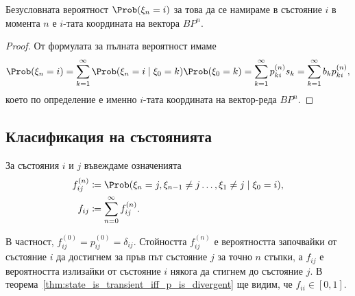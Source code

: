 \documentclass[numbers=endperiod, bibliography=totocnumbered]{scrartcl}
\begin{document}
\begin{corollary}
  Безусловната вероятност \( \Prob(\xi_n = i) \) за това да се намираме в състояние \( i \) в момента \( n \) е \( i \)-тата координата на вектора \( B P^n \).
\end{corollary}
\begin{proof}
  От формулата за пълната вероятност имаме
  \begin{equation*}
    \Prob(\xi_n = i)
    =
    \sum_{k=1}^\infty \Prob(\xi_n = i \mid \xi_0 = k) \Prob(\xi_0 = k)
    =
    \sum_{k=1}^\infty p^{(n)}_{ki} s_k
    =
    \sum_{k=1}^\infty b_k p^{(n)}_{ki},
  \end{equation*}
  което по определение е именно \( i \)-тата координата на вектор-реда \( B P^n \).
\end{proof}

\subsection{Класификация на състоянията}

За състояния \( i \) и \( j \) въвеждаме означенията
\begin{align*}
  f_{ij}^{(n)} &\coloneqq \Prob(\xi_n = j, \xi_{n-1} \neq j \ldots, \xi_1 \neq j \mid \xi_0 = i), \\
  f_{ij} &\coloneqq \sum_{n=0}^\infty f_{ij}^{(n)}.
\end{align*}

В частност, \( f_{ij}^{(0)} = p_{ij}^{(0)} = \delta_{ij} \). Стойността \( f^{(n)}_{ij} \) е вероятността започвайки от състояние \( i \) да достигнем за пръв път състояние \( j \) за точно \( n \) стъпки, а \( f_{ij} \) е вероятността излизайки от състояние \( i \) някога да стигнем до състояние \( j \).  В теорема~\ref{thm:state_is_transient_iff_p_is_divergent} ще видим, че \( f_{ii} \in [0, 1] \).
\end{document}
